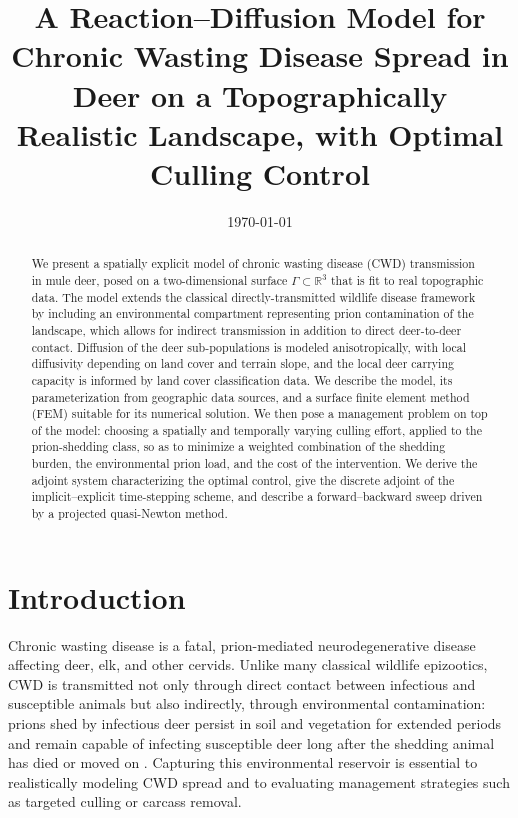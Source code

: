 \documentclass[11pt]{article}
\title{A Reaction--Diffusion Model for Chronic Wasting Disease Spread in Deer on a Topographically Realistic Landscape, with Optimal Culling Control}
\author{}
\date{\today}
\begin{document}
\maketitle

\begin{abstract}
We present a spatially explicit model of chronic wasting disease (CWD) transmission in mule deer, posed on a two-dimensional surface $\Gamma \subset \mathbb{R}^3$ that is fit to real topographic data. The model extends the classical directly-transmitted wildlife disease framework by including an environmental compartment representing prion contamination of the landscape, which allows for indirect transmission in addition to direct deer-to-deer contact. Diffusion of the deer sub-populations is modeled anisotropically, with local diffusivity depending on land cover and terrain slope, and the local deer carrying capacity is informed by land cover classification data. We describe the model, its parameterization from geographic data sources, and a surface finite element method (FEM) suitable for its numerical solution. We then pose a management problem on top of the model: choosing a spatially and temporally varying culling effort, applied to the prion-shedding class, so as to minimize a weighted combination of the shedding burden, the environmental prion load, and the cost of the intervention. We derive the adjoint system characterizing the optimal control, give the discrete adjoint of the implicit--explicit time-stepping scheme, and describe a forward--backward sweep driven by a projected quasi-Newton method.
\end{abstract}

\tableofcontents
\newpage

\section{Introduction}

Chronic wasting disease is a fatal, prion-mediated neurodegenerative disease affecting deer, elk, and other cervids. Unlike many classical wildlife epizootics, CWD is transmitted not only through direct contact between infectious and susceptible animals but also indirectly, through environmental contamination: prions shed by infectious deer persist in soil and vegetation for extended periods and remain capable of infecting susceptible deer long after the shedding animal has died or moved on \citep{Almberg2011}. Capturing this environmental reservoir is essential to realistically modeling CWD spread and to evaluating management strategies such as targeted culling or carcass removal.
\end{document}
